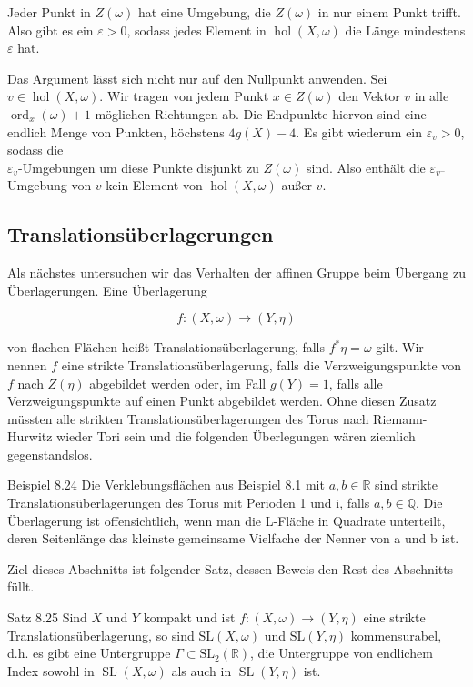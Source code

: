 \documentclass[10pt, letterpaper]{article}
\begin{document}
Jeder Punkt in $Z(\omega)$ hat eine Umgebung, die $Z(\omega)$ in nur einem Punkt trifft. Also gibt es ein $\varepsilon>0$, sodass jedes Element in $\operatorname{hol}(X, \omega)$ die Länge mindestens $\varepsilon$ hat.

Das Argument lässt sich nicht nur auf den Nullpunkt anwenden. Sei $v \in \operatorname{hol}(X, \omega)$. Wir tragen von jedem Punkt $x \in Z(\omega)$ den Vektor $v$ in alle $\operatorname{ord}_{x}(\omega)+1$ möglichen Richtungen ab. Die Endpunkte hiervon sind eine endlich Menge von Punkten, höchstens $4 g(X)-4$. Es gibt wiederum ein $\varepsilon_{v}>0$, sodass die\\
$\varepsilon_{v}$-Umgebungen um diese Punkte disjunkt zu $Z(\omega)$ sind. Also enthält die $\varepsilon_{v^{-}}$ Umgebung von $v$ kein Element von $\operatorname{hol}(X, \omega)$ außer $v$.

\subsection {Translationsüberlagerungen}
Als nächstes untersuchen wir das Verhalten der affinen Gruppe beim Übergang zu Überlagerungen. Eine Überlagerung

$$
f:(X, \omega) \longrightarrow(Y, \eta)
$$

von flachen Flächen heißt Translationsüberlagerung, falls $f^{*} \eta=\omega$ gilt. Wir nennen $f$ eine strikte Translationsüberlagerung, falls die Verzweigungspunkte von $f$ nach $Z(\eta)$ abgebildet werden oder, im Fall $g(Y)=1$, falls alle Verzweigungspunkte auf einen Punkt abgebildet werden. Ohne diesen Zusatz müssten alle strikten Translationsüberlagerungen des Torus nach Riemann-Hurwitz wieder Tori sein und die folgenden Überlegungen wären ziemlich gegenstandslos.

Beispiel 8.24 Die Verklebungsflächen aus Beispiel 8.1 mit $a, b \in \mathbb{R}$ sind strikte Translationsüberlagerungen des Torus mit Perioden 1 und i, falls $a, b \in \mathbb{Q}$. Die Überlagerung ist offensichtlich, wenn man die L-Fläche in Quadrate unterteilt, deren Seitenlänge das kleinste gemeinsame Vielfache der Nenner von a und b ist.

Ziel dieses Abschnitts ist folgender Satz, dessen Beweis den Rest des Abschnitts füllt.

Satz 8.25 Sind $X$ und $Y$ kompakt und ist $f:(X, \omega) \longrightarrow(Y, \eta)$ eine strikte Translationsüberlagerung, so sind $\mathrm{SL}(X, \omega)$ und $\mathrm{SL}(Y, \eta)$ kommensurabel, d.h. es gibt eine Untergruppe $\Gamma \subset \mathrm{SL}_{2}(\mathbb{R})$, die Untergruppe von endlichem Index sowohl in $\operatorname{SL}(X, \omega)$ als auch in $\operatorname{SL}(Y, \eta)$ ist.
\end{document}
